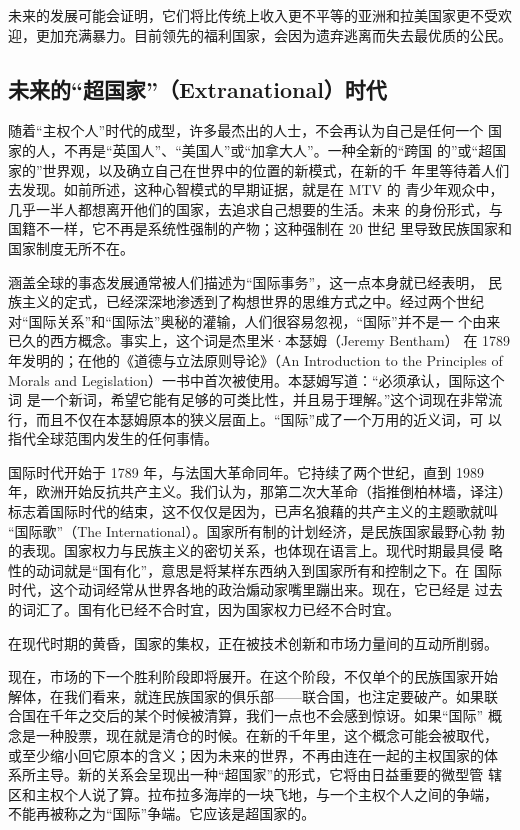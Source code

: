 未来的发展可能会证明，它们将比传统上收入更不平等的亚洲和拉美国家更不受欢迎，更加充满暴力。目前领先的福利国家，会因为遗弃逃离而失去最优质的公民。

\subsection{未来的“超国家”（Extranational）时代}

随着“主权个人”时代的成型，许多最杰出的人士，不会再认为自己是任何一个 国家的人，不再是“英国人”、“美国人”或“加拿大人”。一种全新的“跨国 的”或“超国家的”世界观，以及确立自己在世界中的位置的新模式，在新的千 年里等待着人们去发现。如前所述，这种心智模式的早期证据，就是在 MTV 的 青少年观众中，几乎一半人都想离开他们的国家，去追求自己想要的生活。未来 的身份形式，与国籍不一样，它不再是系统性强制的产物；这种强制在 20 世纪 里导致民族国家和国家制度无所不在。

涵盖全球的事态发展通常被人们描述为“国际事务”，这一点本身就已经表明， 民族主义的定式，已经深深地渗透到了构想世界的思维方式之中。经过两个世纪 对“国际关系”和“国际法”奥秘的灌输，人们很容易忽视，“国际”并不是一 个由来已久的西方概念。事实上，这个词是杰里米·本瑟姆（Jeremy Bentham） 在 1789 年发明的；在他的《道德与立法原则导论》（An Introduction to the Principles of  Morals and Legislation）一书中首次被使用。本瑟姆写道：“必须承认，国际这个词 是一个新词，希望它能有足够的可类比性，并且易于理解。”这个词现在非常流 行，而且不仅在本瑟姆原本的狭义层面上。“国际”成了一个万用的近义词，可 以指代全球范围内发生的任何事情。

国际时代开始于 1789 年，与法国大革命同年。它持续了两个世纪，直到 1989 年，欧洲开始反抗共产主义。我们认为，那第二次大革命（指推倒柏林墙，译注） 标志着国际时代的结束，这不仅仅是因为，已声名狼藉的共产主义的主题歌就叫 “国际歌”（The International）。国家所有制的计划经济，是民族国家最野心勃 勃的表现。国家权力与民族主义的密切关系，也体现在语言上。现代时期最具侵 略性的动词就是“国有化”，意思是将某样东西纳入到国家所有和控制之下。在 国际时代，这个动词经常从世界各地的政治煽动家嘴里蹦出来。现在，它已经是 过去的词汇了。国有化已经不合时宜，因为国家权力已经不合时宜。

在现代时期的黄昏，国家的集权，正在被技术创新和市场力量间的互动所削弱。

现在，市场的下一个胜利阶段即将展开。在这个阶段，不仅单个的民族国家开始 解体，在我们看来，就连民族国家的俱乐部——联合国，也注定要破产。如果联 合国在千年之交后的某个时候被清算，我们一点也不会感到惊讶。如果“国际” 概念是一种股票，现在就是清仓的时候。在新的千年里，这个概念可能会被取代， 或至少缩小回它原本的含义；因为未来的世界，不再由连在一起的主权国家的体 系所主导。新的关系会呈现出一种“超国家”的形式，它将由日益重要的微型管 辖区和主权个人说了算。拉布拉多海岸的一块飞地，与一个主权个人之间的争端， 不能再被称之为“国际”争端。它应该是超国家的。

